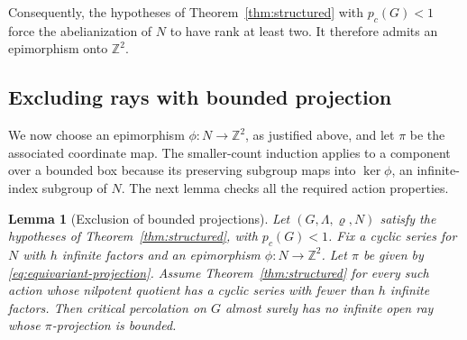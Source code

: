\documentclass[11pt]{article}
\newtheorem{lemma}[theorem]{Lemma}
\theoremstyle{definition}
\newcommand{\pc}{p_c}
\begin{document}
Consequently, the hypotheses of Theorem~\ref{thm:structured} with
$\pc(G)<1$ force the abelianization of $N$ to have rank at least two.
It therefore admits an epimorphism onto $\mathbb Z^2$.

\subsection{Excluding rays with bounded projection}

We now choose an epimorphism \(\phi:N\to\mathbb Z^2\), as justified
above, and let \(\pi\) be the associated coordinate map. The smaller-count
induction applies to a component over a bounded box because its
preserving subgroup maps into \(\ker\phi\), an infinite-index subgroup
of \(N\). The next lemma checks all the required action properties.

\begin{lemma}[Exclusion of bounded projections]
\label{lem:bounded-projection}
\label{lem:unbounded-projection}
Let $(G,\Lambda,\varrho,N)$ satisfy the hypotheses of
Theorem~\ref{thm:structured}, with $\pc(G)<1$. Fix a cyclic series for
$N$ with $h$ infinite factors and an epimorphism $\phi:N\to\mathbb Z^2$.
Let $\pi$ be given by \eqref{eq:equivariant-projection}. Assume
Theorem~\ref{thm:structured} for every such action whose nilpotent
quotient has a cyclic series with fewer than $h$ infinite factors.
Then critical percolation on $G$ almost surely has no infinite open ray
whose $\pi$-projection is bounded.
\end{lemma}
\end{document}
